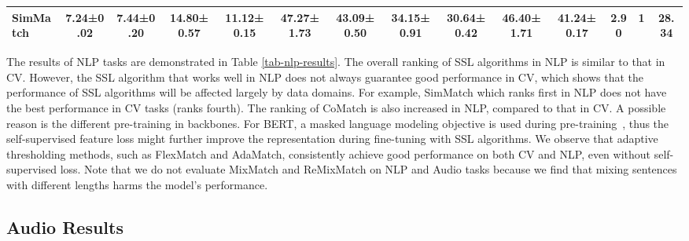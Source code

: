 \documentclass{article}
\begin{document}
\begin{table}[t!]
{\begin{tabular}{l|cc|cc|cc|cc|cc|c|c|c}
SimMatch         & \textbf{7.24\tiny{±0.02}}              & 7.44\tiny{±0.20}                        & 14.80\tiny{±0.57}                       & 11.12\tiny{±0.15}                        & 47.27\tiny{±1.73}                              & \textbf{43.09\tiny{±0.50}}                      & 34.15\tiny{±0.91}                              & 30.64\tiny{±0.42}                               & \textbf{46.40\tiny{±1.71}}                   & 41.24\tiny{±0.17}                             & 2.90                              & 1                              & 28.34                               \\
\bottomrule  
\end{tabular}
}
\end{table}

The results of NLP tasks are demonstrated in Table \ref{tab-nlp-results}. The overall ranking of SSL algorithms in NLP is similar to that in CV. However, the SSL algorithm that works well in NLP does not always guarantee good performance in CV, which shows that the performance of SSL algorithms will be affected largely by data domains. For example, SimMatch which ranks first in NLP does not have the best performance in CV tasks (ranks fourth). The ranking of CoMatch is also increased in NLP, compared to that in CV. A possible reason is the different pre-training in backbones. For BERT, a masked language modeling objective is used during pre-training~\cite{bert}, thus the self-supervised feature loss might further improve the representation during fine-tuning with SSL algorithms. We observe that adaptive thresholding methods, such as FlexMatch and AdaMatch, consistently achieve good performance on both CV and NLP, even without self-supervised loss.
Note that we do not evaluate MixMatch and ReMixMatch on NLP and Audio tasks because we find that mixing sentences with different lengths harms the model's performance.

\subsection{Audio Results}
\end{document}
